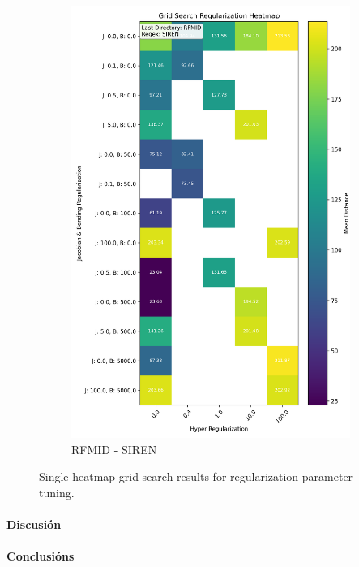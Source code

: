 \begin{figure}[ht]
\begin{subfigure}[b]{0.45\textwidth}
        \includegraphics[width=\textwidth]{imaxes/grid_search_single_heatmap_RFMID_SIREN.png}
        \caption{RFMID - SIREN}
        \label{fig:gs_single_RFMID_SIREN}
    \end{subfigure}
    
    \caption{Single heatmap grid search results for regularization parameter tuning.}
    \label{fig:gs_single_heatmaps}
\end{figure}


\paragraph{Discusión}
\label{par:Discusión}

\paragraph{Conclusións}
\label{par:Conclusións}



